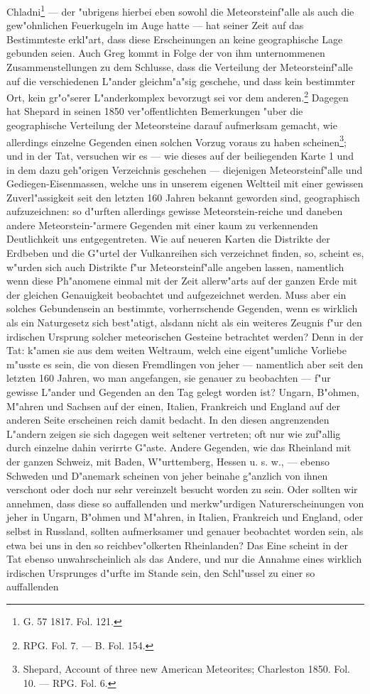 \documentclass[a4paper, 8pt, oneside, polutonikogreek, german]{article}
\begin{document}
Chladni\footnote{G. 57 1817. Fol. 121.} --- der "ubrigens hierbei eben sowohl die Meteorsteinf"alle als auch die gew"ohnlichen Feuerkugeln im Auge hatte --- hat seiner Zeit auf das Bestimmteste erkl"art, dass diese Erscheinungen an keine geographische Lage gebunden seien. Auch Greg kommt in Folge der von ihm unternommenen Zusammenstellungen zu dem Schlusse, dass die Verteilung der Meteorsteinf"alle auf die verschiedenen L"ander gleichm"a"sig geschehe, und dass kein bestimmter Ort, kein gr"o"serer L"anderkomplex bevorzugt sei vor dem anderen.\footnote{RPG. Fol. 7. — B. Fol. 154.} Dagegen hat Shepard in seinen 1850 ver"offentlichten Bemerkungen "uber die geographische Verteilung der Meteorsteine darauf aufmerksam gemacht, wie allerdings einzelne Gegenden einen solchen Vorzug voraus zu haben scheinen\footnote{Shepard, Account of three new American Meteorites; Charleston 1850. Fol. 10. — RPG. Fol. 6.}; und in der Tat, versuchen wir es --- wie dieses auf der beiliegenden Karte 1 und in dem dazu geh"origen Verzeichnis geschehen --- diejenigen Meteorsteinf"alle und Gediegen-Eisenmassen, welche uns in unserem eigenen Weltteil mit einer gewissen Zuverl"assigkeit seit den letzten 160 Jahren bekannt geworden sind, geographisch aufzuzeichnen: so d"urften allerdings gewisse Meteorstein-reiche und daneben andere Meteorstein-"armere Gegenden mit einer kaum zu verkennenden Deutlichkeit uns entgegentreten. Wie auf neueren Karten die Distrikte der Erdbeben und die G"urtel der Vulkanreihen sich verzeichnet finden, so, scheint es, w"urden sich auch Distrikte f"ur Meteorsteinf"alle angeben lassen, namentlich wenn diese Ph"anomene einmal mit der Zeit allerw"arts auf der ganzen Erde mit der gleichen Genauigkeit beobachtet und aufgezeichnet werden. Muss aber ein solches Gebundensein an bestimmte, vorherrschende Gegenden, wenn es wirklich als ein Naturgesetz sich best"atigt, alsdann nicht als ein weiteres Zeugnis f"ur den irdischen Ursprung solcher meteorischen Gesteine betrachtet werden? Denn in der Tat: k"amen sie aus dem weiten Weltraum, welch eine eigent"umliche Vorliebe m"usste es sein, die von diesen Fremdlingen von jeher --- namentlich aber seit den letzten 160 Jahren, wo man angefangen, sie genauer zu beobachten --- f"ur gewisse L"ander und Gegenden an den Tag gelegt worden ist? Ungarn, B"ohmen, M"ahren und Sachsen auf der einen, Italien, Frankreich und England auf der anderen Seite erscheinen reich damit bedacht. In den diesen angrenzenden L"andern zeigen sie sich dagegen weit seltener vertreten; oft nur wie zuf"allig durch einzelne dahin verirrte G"aste. Andere Gegenden, wie das Rheinland mit der ganzen Schweiz, mit Baden, W"urttemberg, Hessen u. s. w., --- ebenso Schweden und D"anemark scheinen von jeher beinahe g"anzlich von ihnen verschont oder doch nur sehr vereinzelt besucht worden zu sein. Oder sollten wir annehmen, dass diese so auffallenden und merkw"urdigen Naturerscheinungen von jeher in Ungarn, B"ohmen und M"ahren, in Italien, Frankreich und England, oder selbst in Russland, sollten aufmerksamer und genauer beobachtet worden sein, als etwa bei uns in den so reichbev"olkerten Rheinlanden? Das Eine scheint in der Tat ebenso unwahrscheinlich als das Andere, und nur die Annahme eines wirklich irdischen Ursprunges d"urfte im Stande sein, den Schl"ussel zu einer so auffallenden 
\end{document}

